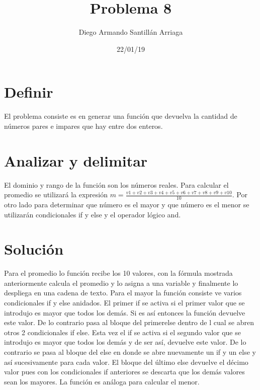 \documentclass[letterpaper, 12pt, oneside]{article}%
\title{\Huge Problema 8}
\author{Diego Armando Santillán Arriaga}
\date{22/01/19}
\begin{document}
\maketitle
\newpage
\section*{Definir}
El problema consiste es en generar una función que devuelva la cantidad de números pares e impares que hay entre dos enteros. 
\section*{Analizar y delimitar}
El dominio y rango de la función son los números reales. Para calcular el promedio se utilizará la expresión $ m = \frac{v1+v2+v3+v4+v5+v6+v7+v8+v9+v10}{10} $. Por otro lado para determinar que número es el mayor y que número es el menor se utilizarán condicionales if y else y el operador lógico and. 
\section*{Solución}
Para el promedio lo función recibe los 10 valores, con la fórmula mostrada anteriormente calcula el promedio y lo asigna a una variable y finalmente lo despliega en una cadena de texto. 
Para el mayor la función consiste ve varios condicionales if y else anidados. El primer if se activa si el primer valor que se introdujo es mayor que todos los demás. Si es así entonces la función devuelve este valor. De lo contrario pasa al bloque del primerelse dentro de l cual se abren otros 2 condicionales if else. Esta vez el if se activa si el segundo valor que se introdujo es mayor que todos los demás y de ser así, devuelve este valor. De lo contrario se pasa al bloque del else en donde se abre nuevamente un if y un else y así sucesivamente para cada valor. El bloque del último else devuelve el décimo valor pues con los condicionales if anteriores se descarta que los demás valores sean los mayores. 
La función es análoga para calcular el menor. 
\end{document}
